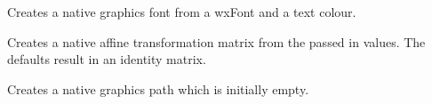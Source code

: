 \label{wxgraphicsrenderercreatefont}


Creates a native graphics font from a wxFont and a text colour.

\label{wxgraphicsrenderercreatematrix}


Creates a native affine transformation matrix from the passed in values. The defaults result in an identity matrix.

\label{wxgraphicsrenderercreatepath}


Creates a native graphics path which is initially empty.


